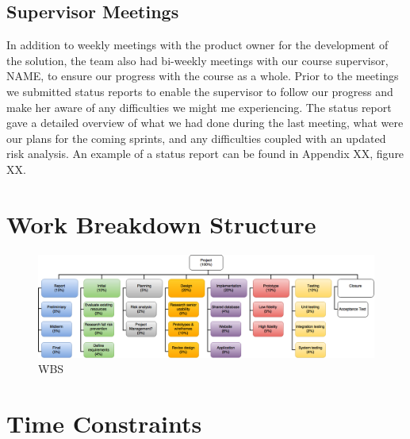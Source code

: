 \subsection{Supervisor Meetings}
In addition to weekly meetings with the product owner for the development of the solution, the team also had bi-weekly meetings with our course supervisor, NAME, to ensure our progress with the course as a whole. Prior to the meetings we submitted status reports to enable the supervisor to follow our progress and make her aware of any difficulties we might me experiencing. The status report gave a detailed overview of what we had done during the last meeting, what were our plans for the coming sprints, and any difficulties coupled with an updated risk analysis. An example of a status report can be found in Appendix XX, figure XX.


\section{Work Breakdown Structure}

\begin{figure}[h!]
\centering
\includegraphics[scale=0.4]{Figures/WBS.png}
\caption{WBS}
\label{fig:WBS}
\end{figure}

\section{Time Constraints}



